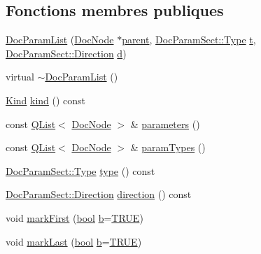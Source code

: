 \subsection*{Fonctions membres publiques}
\begin{DoxyCompactItemize}
\item 
\hyperlink{class_doc_param_list_a24cfde49c6be5a456c6ed4de83bd8beb}{Doc\+Param\+List} (\hyperlink{class_doc_node}{Doc\+Node} $\ast$\hyperlink{class_doc_node_a990d8b983962776a647e6231d38bd329}{parent}, \hyperlink{class_doc_param_sect_a402e8723e8b9f22c5ffa84046224d51a}{Doc\+Param\+Sect\+::\+Type} \hyperlink{058__bracket__recursion_8tcl_a69e959f6901827e4d8271aeaa5fba0fc}{t}, \hyperlink{class_doc_param_sect_ad5e3f053f03f8c333a69208521075c66}{Doc\+Param\+Sect\+::\+Direction} \hyperlink{060__command__switch_8tcl_af43f4b1f0064a33b2d662af9f06d3a00}{d})
\item 
virtual \hyperlink{class_doc_param_list_ae12f98f634a0df31cb44735414654751}{$\sim$\+Doc\+Param\+List} ()
\item 
\hyperlink{class_doc_node_aebd16e89ca590d84cbd40543ea5faadb}{Kind} \hyperlink{class_doc_param_list_a52e0a7a0ff48215cd1254cf975613082}{kind} () const 
\item 
const \hyperlink{class_q_list}{Q\+List}$<$ \hyperlink{class_doc_node}{Doc\+Node} $>$ \& \hyperlink{class_doc_param_list_a607d79c8a9676bcb301813e5bd098752}{parameters} ()
\item 
const \hyperlink{class_q_list}{Q\+List}$<$ \hyperlink{class_doc_node}{Doc\+Node} $>$ \& \hyperlink{class_doc_param_list_a1de2caf710c83eeaaf431e2f9b7f22e5}{param\+Types} ()
\item 
\hyperlink{class_doc_param_sect_a402e8723e8b9f22c5ffa84046224d51a}{Doc\+Param\+Sect\+::\+Type} \hyperlink{class_doc_param_list_a2718c4de761f478aeb9df9d8470a7081}{type} () const 
\item 
\hyperlink{class_doc_param_sect_ad5e3f053f03f8c333a69208521075c66}{Doc\+Param\+Sect\+::\+Direction} \hyperlink{class_doc_param_list_a5859a942a9519097f903c4553055f067}{direction} () const 
\item 
void \hyperlink{class_doc_param_list_a6b3e3e25859cc2d76b312b988c018d08}{mark\+First} (\hyperlink{qglobal_8h_a1062901a7428fdd9c7f180f5e01ea056}{bool} \hyperlink{060__command__switch_8tcl_a68bdb74c144118d936931c46f75d4b3e}{b}=\hyperlink{qglobal_8h_a04a6422a52070f0dc478693da640242b}{T\+R\+U\+E})
\item 
void \hyperlink{class_doc_param_list_a89fc37af294659364193e14680065668}{mark\+Last} (\hyperlink{qglobal_8h_a1062901a7428fdd9c7f180f5e01ea056}{bool} \hyperlink{060__command__switch_8tcl_a68bdb74c144118d936931c46f75d4b3e}{b}=\hyperlink{qglobal_8h_a04a6422a52070f0dc478693da640242b}{T\+R\+U\+E})

\end{DoxyCompactItemize}

